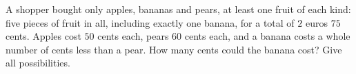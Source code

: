A shopper bought only apples, bananas and pears, at least one fruit of each kind: five pieces of fruit in all, including exactly one banana, for a total of $2$ euros $75$ cents. Apples cost $50$ cents each, pears $60$ cents each, and a banana costs a whole number of cents less than a pear. How many cents could the banana cost? Give all possibilities.
